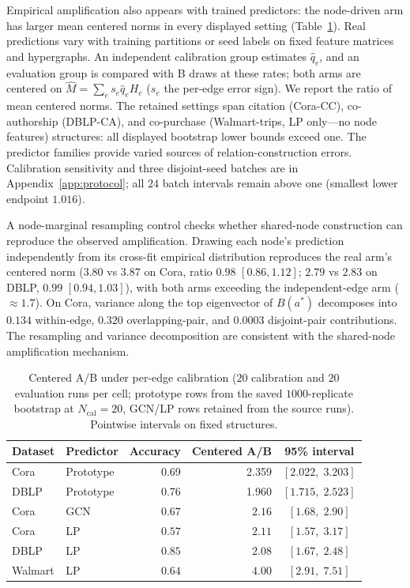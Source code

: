 \documentclass[preprint,11pt]{elsarticle}
\begin{document}
Empirical amplification also appears with trained predictors:
the node-driven arm has larger mean centered norms in every displayed
setting (Table~\ref{tab:real-main}). Real predictions vary with
training partitions or seed labels on fixed
feature matrices and hypergraphs. An independent calibration group
estimates $\hat q_e$, and an evaluation group is compared with B draws
at these rates; both arms are centered on $\hat M=\sum_es_e\hat q_eH_e$
($s_e$ the per-edge error sign). We report the ratio of mean centered
norms. The retained
settings span citation (Cora-CC), co-authorship (DBLP-CA), and
co-purchase (Walmart-trips, LP only---no node features) structures:
all displayed bootstrap lower bounds exceed one. The predictor families provide varied
sources of relation-construction errors. Calibration sensitivity and three
disjoint-seed batches are in Appendix~\ref{app:protocol}; all $24$
batch intervals remain above one (smallest lower endpoint $1.016$).

A node-marginal resampling control checks whether shared-node
construction can reproduce the observed amplification. Drawing each node's prediction
independently from its cross-fit empirical distribution reproduces
the real arm's centered norm ($3.80$ vs $3.87$ on Cora, ratio $0.98$
$[0.86,1.12]$; $2.79$ vs $2.83$ on DBLP, $0.99$ $[0.94,1.03]$), with
both arms exceeding the independent-edge arm ($\approx1.7$). On Cora,
variance along the top eigenvector of $B(a^*)$ decomposes into
$0.134$ within-edge, $0.320$ overlapping-pair, and $0.0003$
disjoint-pair contributions. The resampling and variance decomposition
are consistent with the shared-node amplification mechanism.

\begin{table}[htbp]
\centering\small
\begin{tabular}{llrrc}
\toprule
Dataset & Predictor & Accuracy & Centered A/B & 95\% interval\\
\midrule
Cora & Prototype & 0.69 & 2.359 & $[2.022,\;3.203]$ \\
DBLP & Prototype & 0.76 & 1.960 & $[1.715,\;2.523]$ \\
Cora & GCN & $0.67$ & $2.16$ & $[1.68,\;2.90]$\\
Cora & LP & $0.57$ & $2.11$ & $[1.57,\;3.17]$\\
DBLP & LP & $0.85$ & $2.08$ & $[1.67,\;2.48]$\\
Walmart & LP & $0.64$ & $4.00$ & $[2.91,\;7.51]$\\
\bottomrule
\end{tabular}
\caption{Centered A/B under per-edge calibration ($20$ calibration and
$20$ evaluation runs per cell; prototype rows from the saved
$1000$-replicate bootstrap at $N_{\mathrm{cal}}=20$, GCN/LP rows
retained from the source runs). Pointwise intervals on fixed
structures.}
\label{tab:real-main}
\end{table}
\end{document}
